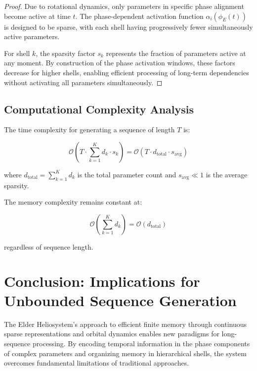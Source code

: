 \begin{proof}
Due to rotational dynamics, only parameters in specific phase alignment become active at time $t$. The phase-dependent activation function $\alpha_i(\phi_E(t))$ is designed to be sparse, with each shell having progressively fewer simultaneously active parameters.

For shell $k$, the sparsity factor $s_k$ represents the fraction of parameters active at any moment. By construction of the phase activation windows, these factors decrease for higher shells, enabling efficient processing of long-term dependencies without activating all parameters simultaneously.
\end{proof}

\subsection{Computational Complexity Analysis}

\begin{corollary}
The time complexity for generating a sequence of length $T$ is:

\begin{equation}
\mathcal{O}(T \cdot \sum_{k=1}^K d_k \cdot s_k) = \mathcal{O}(T \cdot d_{\text{total}} \cdot s_{\text{avg}})
\end{equation}

where $d_{\text{total}} = \sum_{k=1}^K d_k$ is the total parameter count and $s_{\text{avg}} \ll 1$ is the average sparsity.
\end{corollary}

\begin{corollary}
The memory complexity remains constant at:

\begin{equation}
\mathcal{O}(\sum_{k=1}^K d_k) = \mathcal{O}(d_{\text{total}})
\end{equation}

regardless of sequence length.
\end{corollary}



\section{Conclusion: Implications for Unbounded Sequence Generation}

The Elder Heliosystem's approach to efficient finite memory through continuous sparse representations and orbital dynamics enables new paradigms for long-sequence processing. By encoding temporal information in the phase components of complex parameters and organizing memory in hierarchical shells, the system overcomes fundamental limitations of traditional approaches.

